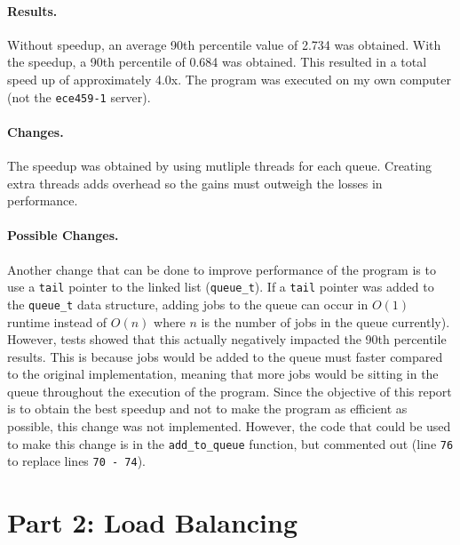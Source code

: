\documentclass[12pt]{article}
\begin{document}
\paragraph{Results.} Without speedup, an average 90th percentile value of 2.734 was obtained. With the speedup, a 90th percentile of 0.684 was obtained. This resulted in a total speed up of approximately 4.0x. The program was executed on my own computer (not the {\tt ece459-1} server).

\paragraph{Changes.} The speedup was obtained by using mutliple threads for each queue. Creating extra threads adds overhead so the gains must outweigh the losses in performance.

\paragraph{Possible Changes.} Another change that can be done to improve performance of the program is to use a {\tt tail} pointer to the linked list ({\tt queue_t}). If a {\tt tail} pointer was added to the {\tt queue_t} data structure, adding jobs to the queue can occur in \( O(1) \) runtime instead of \( O(n) \) where \( n \) is the number of jobs in the queue currently). However, tests showed that this actually negatively impacted the 90th percentile results. This is because jobs would be added to the queue must faster compared to the original implementation, meaning that more jobs would be sitting in the queue throughout the execution of the program. Since the objective of this report is to obtain the best speedup and not to make the program as efficient as possible, this change was not implemented. However, the code that could be used to make this change is in the {\tt add_to_queue} function, but commented out (line {\tt 76} to replace lines {\tt 70 - 74}).

\section*{Part 2: Load Balancing}
\end{document}
